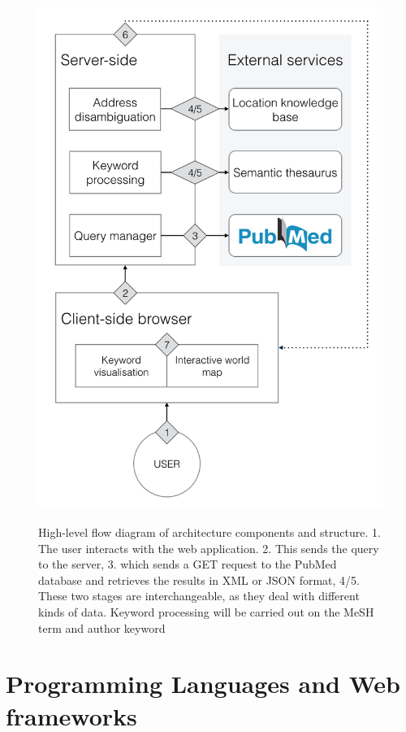 \documentclass[PROP_AGutteridge_CS.tex]{subfiles}
\begin{document}
\begin{figure}
	\begin{center}
	\includegraphics[width=\textwidth]{../lib/images/system-arch}
	\label{fig:SA}
  	\end{center}
 	\caption{High-level flow diagram of architecture components and structure. 1. The user interacts with the web application. 2. This sends the query to the server, 3. which sends a GET request to the PubMed database and retrieves the results in XML or JSON format, 4/5. These two stages are interchangeable, as they deal with different kinds of data. Keyword processing will be carried out on the MeSH term and author keyword }
\end{figure}

\section{Programming Languages and Web frameworks}
\end{document}
